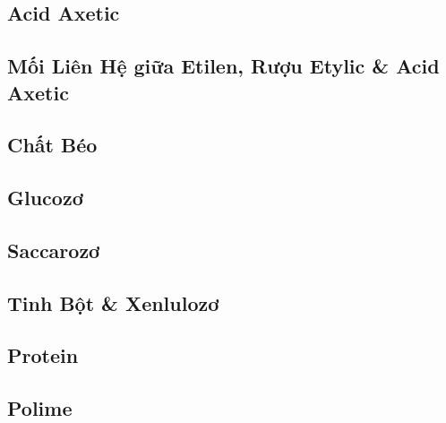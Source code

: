 \documentclass{article}
\numberwithin{equation}{section}
\begin{document}

\subsection{Acid Axetic}


\subsection{Mối Liên Hệ giữa Etilen, Rượu Etylic \& Acid Axetic}


\subsection{Chất Béo}


\subsection{Glucozơ}


\subsection{Saccarozơ}


\subsection{Tinh Bột \& Xenlulozơ}


\subsection{Protein}


\subsection{Polime}


\printbibliography[heading=bibintoc]
	
\end{document}
